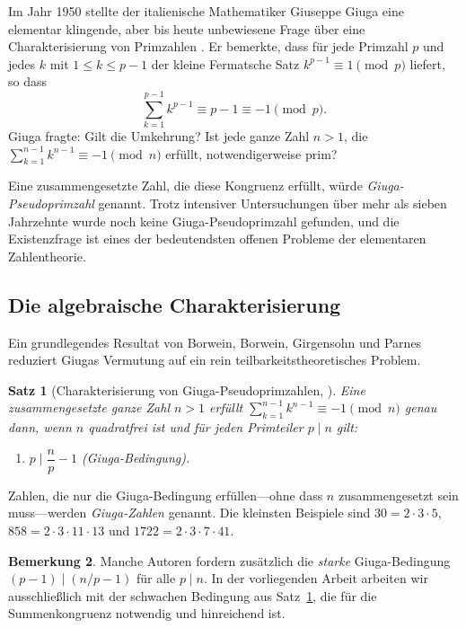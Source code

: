 \documentclass[12pt,a4paper]{amsart}
\newtheorem{theorem}{Satz}[section]
\theoremstyle{definition}
\newtheorem{remark}[theorem]{Bemerkung}
\begin{document}
Im Jahr 1950 stellte der italienische Mathematiker Giuseppe Giuga eine
elementar klingende, aber bis heute unbewiesene Frage über eine Charakterisierung
von Primzahlen \cite{Giuga1950}.  Er bemerkte, dass für jede Primzahl $p$ und
jedes $k$ mit $1 \le k \le p-1$ der kleine Fermatsche Satz $k^{p-1} \equiv 1
\pmod{p}$ liefert, so dass
\[
  \sum_{k=1}^{p-1} k^{p-1} \equiv p - 1 \equiv -1 \pmod{p}.
\]
Giuga fragte: Gilt die Umkehrung?  Ist jede ganze Zahl $n > 1$, die
$\sum_{k=1}^{n-1} k^{n-1} \equiv -1 \pmod{n}$ erfüllt, notwendigerweise prim?

Eine zusammengesetzte Zahl, die diese Kongruenz erfüllt, würde
\emph{Giuga-Pseudoprimzahl} genannt.  Trotz intensiver Untersuchungen über
mehr als sieben Jahrzehnte wurde noch keine Giuga-Pseudoprimzahl gefunden,
und die Existenzfrage ist eines der bedeutendsten offenen Probleme der
elementaren Zahlentheorie.

\subsection{Die algebraische Charakterisierung}

Ein grundlegendes Resultat von Borwein, Borwein, Girgensohn und
Parnes \cite{Borwein1996} reduziert Giugas Vermutung auf ein rein
teilbarkeitstheoretisches Problem.

\begin{theorem}[Charakterisierung von Giuga-Pseudoprimzahlen, {\cite{Borwein1996}}]
\label{satz:char}
Eine zusammengesetzte ganze Zahl $n > 1$ erfüllt $\sum_{k=1}^{n-1} k^{n-1}
\equiv -1 \pmod{n}$ genau dann, wenn $n$ quadratfrei ist und für jeden
Primteiler $p \mid n$ gilt:
\begin{enumerate}[label=\textup{(\Roman*)}]
  \item $p \mid \dfrac{n}{p} - 1$ \quad\textup{(Giuga-Bedingung)}.
\end{enumerate}
\end{theorem}

Zahlen, die nur die Giuga-Bedingung erfüllen---ohne dass $n$ zusammengesetzt
sein muss---werden \emph{Giuga-Zahlen} genannt.  Die kleinsten Beispiele sind
$30 = 2 \cdot 3 \cdot 5$, $858 = 2 \cdot 3 \cdot 11 \cdot 13$ und
$1722 = 2 \cdot 3 \cdot 7 \cdot 41$.

\begin{remark}
Manche Autoren fordern zusätzlich die \emph{starke} Giuga-Bedingung
$(p-1) \mid (n/p - 1)$ für alle $p \mid n$.  In der vorliegenden Arbeit
arbeiten wir ausschließlich mit der schwachen Bedingung aus Satz~\ref{satz:char},
die für die Summenkongruenz notwendig und hinreichend ist.
\end{remark}
\end{document}
